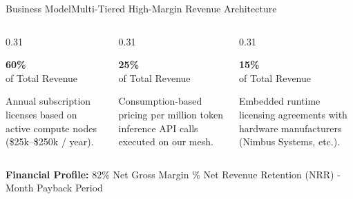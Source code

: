 \documentclass[aspectratio=169,10pt]{beamer}
\begin{document}
\begin{frame}{Business Model}{Multi-Tiered High-Margin Revenue Architecture}
  \begin{columns}[T]
    \begin{column}{0.31\textwidth}
      \begin{tcolorbox}[darkcard, title={\small Enterprise SaaS}]
        {\Huge \bfseries \color{neoncyan} 60\%} \\
        \tiny \color{textmuted} of Total Revenue
        \par\vspace*{0.15cm}
        \scriptsize
        Annual subscription licenses based on active compute nodes (\$25k--\$250k / year).
      \end{tcolorbox}
    \end{column}
    
    \begin{column}{0.31\textwidth}
      \begin{tcolorbox}[darkcard, title={\small Usage Compute}]
        {\Huge \bfseries \color{neonpurple} 25\%} \\
        \tiny \color{textmuted} of Total Revenue
        \par\vspace*{0.15cm}
        \scriptsize
        Consumption-based pricing per million token inference API calls executed on our mesh.
      \end{tcolorbox}
    \end{column}
    
    \begin{column}{0.31\textwidth}
      \begin{tcolorbox}[darkcard, title={\small OEM \& Partners}]
        {\Huge \bfseries \color{emeralds} 15\%} \\
        \tiny \color{textmuted} of Total Revenue
        \par\vspace*{0.15cm}
        \scriptsize
        Embedded runtime licensing agreements with hardware manufacturers (Nimbus Systems, etc.).
      \end{tcolorbox}
    \end{column}
  \end{columns}

  \vspace*{0.25cm}
  \begin{tcolorbox}[purplecard]
    \centering \small \textbf{Financial Profile:} 82\% Net Gross Margin \quad\textbullet{}\% Net Revenue Retention (NRR) \quad\textbullet{}-Month Payback Period
  \end{tcolorbox}
\end{frame}
\end{document}
